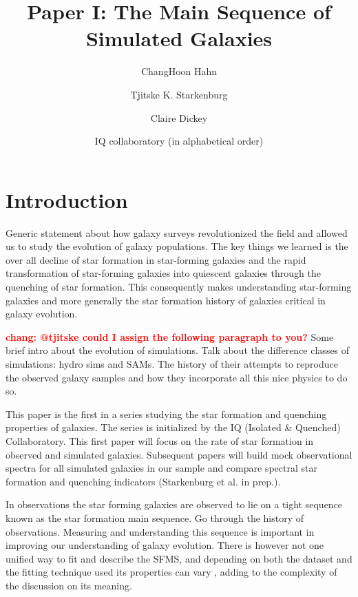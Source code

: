 \documentclass[preprint2,tighten]{aastex62}
\newcommand{\todo}[1]{{\bf \textcolor{red}{ #1}}}
\begin{document}
\title{Paper I: The Main Sequence of Simulated Galaxies}
\author{ChangHoon Hahn}
\author{Tjitske K. Starkenburg}
\author{Claire Dickey}

\author{IQ collaboratory (in alphabetical order)}

\begin{abstract}


\end{abstract}

\section{Introduction}
Generic statement about how galaxy surveys revolutionized the field and allowed
us to study the evolution of galaxy populations. The key things we learned is the
over all decline of star formation in star-forming galaxies and the rapid 
transformation of star-forming galaxies into quiescent galaxies through the 
quenching of star formation. This consequently makes understanding star-forming 
galaxies and more generally the star formation history of galaxies critical in 
galaxy evolution. 

\todo{chang: @tjitske could I assign the following paragraph to you?}
Some brief intro about the evolution of simulations. Talk about the difference 
classes of simulations: hydro sims and SAMs. The history of their attempts to 
reproduce the observed galaxy samples and how they incorporate all this nice 
physics to do so. 

This paper is the first in a series studying the star formation and quenching properties of galaxies. The series is initialized by the IQ (Isolated \& Quenched) Collaboratory. This first paper will focus on the rate of star formation in observed and simulated galaxies. Subsequent papers will build mock observational spectra for all simulated galaxies in our sample and compare spectral star formation and quenching indicators (Starkenburg et al. in prep.).

In observations the star forming galaxies are observed to lie on a tight sequence
known as the star formation main sequence. Go through the history of observations.
Measuring and understanding this sequence is important in improving our
understanding of galaxy evolution. There is however not one unified way to fit and describe the SFMS, and depending on both the dataset and the fitting technique used its properties can vary \citep[see e.g.][]{speagle2014}, adding to the complexity of the discussion on its meaning.
\end{document}
